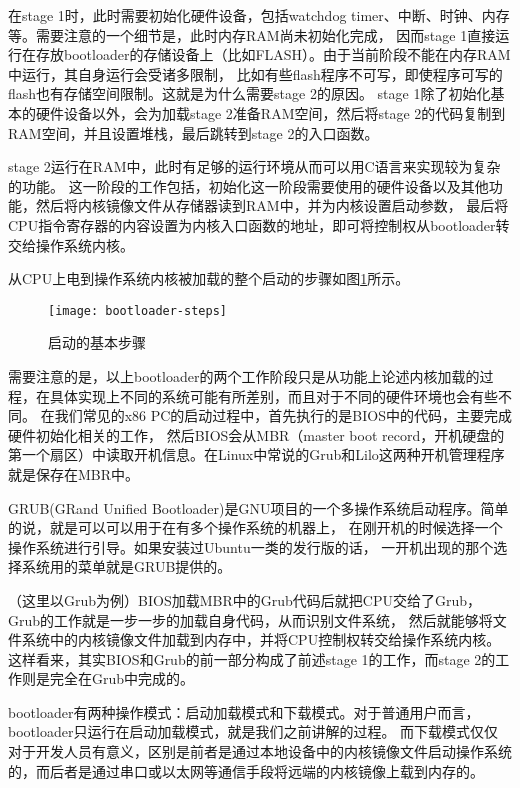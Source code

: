 在stage 1时，此时需要初始化硬件设备，包括watchdog timer、中断、时钟、内存等。需要注意的一个细节是，此时内存RAM尚未初始化完成，
因而stage 1直接运行在存放bootloader的存储设备上（比如FLASH）。由于当前阶段不能在内存RAM中运行，其自身运行会受诸多限制，
比如有些flash程序不可写，即使程序可写的flash也有存储空间限制。这就是为什么需要stage 2的原因。
stage 1除了初始化基本的硬件设备以外，会为加载stage 2准备RAM空间，然后将stage 2的代码复制到RAM空间，并且设置堆栈，最后跳转到stage 2的入口函数。

stage 2运行在RAM中，此时有足够的运行环境从而可以用C语言来实现较为复杂的功能。
这一阶段的工作包括，初始化这一阶段需要使用的硬件设备以及其他功能，然后将内核镜像文件从存储器读到RAM中，并为内核设置启动参数，
最后将CPU指令寄存器的内容设置为内核入口函数的地址，即可将控制权从bootloader转交给操作系统内核。

从CPU上电到操作系统内核被加载的整个启动的步骤如图\ref{fig:bootloader-steps}所示。

\begin{figure}[htbp]
  \centering
  \texttt{[image: bootloader-steps]}
  \caption{启动的基本步骤}\label{fig:bootloader-steps} 
\end{figure}

需要注意的是，以上bootloader的两个工作阶段只是从功能上论述内核加载的过程，在具体实现上不同的系统可能有所差别，而且对于不同的硬件环境也会有些不同。
在我们常见的x86 PC的启动过程中，首先执行的是BIOS中的代码，主要完成硬件初始化相关的工作，
然后BIOS会从MBR（master boot record，开机硬盘的第一个扇区）中读取开机信息。在Linux中常说的Grub和Lilo这两种开机管理程序就是保存在MBR中。

\begin{note}
GRUB(GRand Unified Bootloader)是GNU项目的一个多操作系统启动程序。简单的说，就是可以可以用于在有多个操作系统的机器上，
在刚开机的时候选择一个操作系统进行引导。如果安装过Ubuntu一类的发行版的话， 一开机出现的那个选择系统用的菜单就是GRUB提供的。
\end{note}

（这里以Grub为例）BIOS加载MBR中的Grub代码后就把CPU交给了Grub，Grub的工作就是一步一步的加载自身代码，从而识别文件系统，
然后就能够将文件系统中的内核镜像文件加载到内存中，并将CPU控制权转交给操作系统内核。
这样看来，其实BIOS和Grub的前一部分构成了前述stage 1的工作，而stage 2的工作则是完全在Grub中完成的。

\begin{note}
bootloader有两种操作模式：启动加载模式和下载模式。对于普通用户而言，bootloader只运行在启动加载模式，就是我们之前讲解的过程。
而下载模式仅仅对于开发人员有意义，区别是前者是通过本地设备中的内核镜像文件启动操作系统的，而后者是通过串口或以太网等通信手段将远端的内核镜像上载到内存的。
\end{note}

